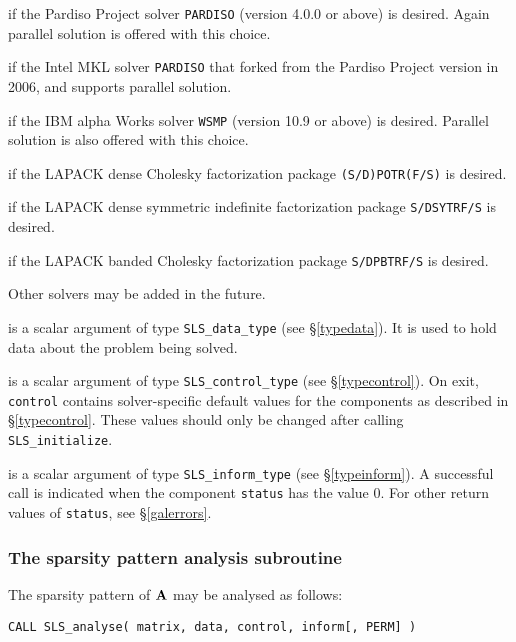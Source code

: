 \documentclass{galahad}
\newcommand{\packagename}{SLS}
\begin{document}
\begin{description}
\begin{description}
 if the Pardiso Project solver {\tt PARDISO} (version 4.0.0
or above) is desired. Again parallel solution is offered with this choice.

 if the Intel MKL solver {\tt PARDISO} that forked from the
Pardiso Project version in 2006, and supports parallel solution.

 if the IBM alpha Works solver {\tt WSMP} (version 10.9
or above) is desired. Parallel solution is also offered with this choice.

 if the LAPACK dense Cholesky factorization package
{\tt (S/D)POTR(F/S)} is desired.

 if the LAPACK dense symmetric indefinite factorization package
{\tt S/DSYTRF/S} is desired.

 if the LAPACK banded Cholesky factorization package
{\tt S/DPBTRF/S} is desired.

\end{description}
Other solvers may be added in the future.

 is a scalar \intentout argument of type
{\tt \packagename\_data\_type}
(see \S\ref{typedata}). It is used to hold data about the problem being
solved.

 is a scalar \intentout argument of type
{\tt \packagename\_control\_type}
(see \S\ref{typecontrol}).
On exit, {\tt control} contains solver-specific default values for the
components as described in \S\ref{typecontrol}.
These values should only be changed after calling
{\tt \packagename\_initialize}.

 is a scalar \intentout argument of type
{\tt \packagename\_inform\_type}
(see \S\ref{typeinform}).
A successful call is indicated when the  component {\tt status} has the value 0.
For other return values of {\tt status}, see \S\ref{galerrors}.

\end{description}


\subsubsection{The sparsity pattern analysis subroutine}
The sparsity pattern of ${\mathbf{A}}$ may be analysed as follows:

\hskip0.5in
{\tt CALL \packagename\_analyse( matrix, data, control, inform[, PERM] )}
\end{document}
